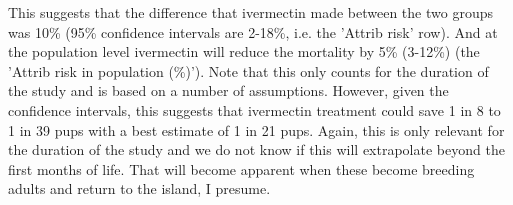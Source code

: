 \documentclass{article}
\begin{document}
This suggests that the difference that ivermectin made between the two groups was 10\% (95\% confidence intervals are 2-18\%, i.e. the 'Attrib risk' row). And at the population level ivermectin will reduce the mortality by 5\% (3-12\%) (the 'Attrib risk in population (\%)'). Note that this only counts for the duration of the study and is based on a number of assumptions. However, given the confidence intervals, this suggests that ivermectin treatment could save 1 in 8 to 1 in 39 pups with a best estimate of 1 in 21 pups. Again, this is only relevant for the duration of the study and we do not know if this will extrapolate beyond the first months of life. That will become apparent when these become breeding adults and return to the island, I presume.
\end{document}
